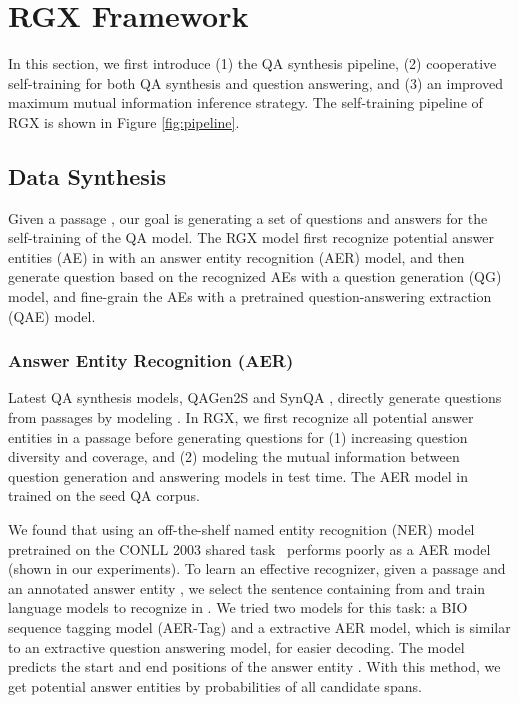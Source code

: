 \documentclass[11pt,a4paper]{article}
\begin{document}
\section{RGX Framework}
In this section, we first introduce (1) the QA synthesis pipeline, (2) cooperative self-training for both QA synthesis and question answering, and (3) an improved maximum mutual information inference strategy. The self-training pipeline of RGX is shown in Figure \ref{fig:pipeline}.



\subsection{Data Synthesis}
Given a passage , our goal is generating a set of questions  and answers  for the self-training of the QA model. The RGX model first recognize potential answer entities (AE) in  with an answer entity recognition (AER) model, and then generate question based on the recognized AEs with a question generation (QG) model, and fine-grain the AEs with a pretrained question-answering extraction (QAE) model.






\subsubsection{Answer Entity Recognition (AER)}
\label{sec:aer-st}
Latest QA synthesis models, QAGen2S \cite{shakeri2020end} and SynQA \cite{bartolo2021improving}, directly generate questions from passages by modeling  . In RGX, we first recognize all potential answer entities in a passage before generating questions for (1) increasing question diversity and coverage, and (2) modeling the mutual information between question generation and answering models in test time. The AER model in trained on the seed QA corpus.

We found that using an off-the-shelf named entity recognition (NER) model pretrained on the CONLL 2003 shared task~\cite{bender2003conll} performs poorly as a AER model (shown in our experiments). To learn an effective recognizer, given a passage  and an annotated answer entity , we select the sentence  containing  from  and train language models to recognize  in . We tried two models for this task: a BIO sequence tagging model (AER-Tag) and a extractive AER model, which is similar to an extractive question answering model, for easier decoding. The model predicts the start and end positions of the answer entity . With this method, we get potential answer entities by probabilities of all candidate spans. 
\end{document}
